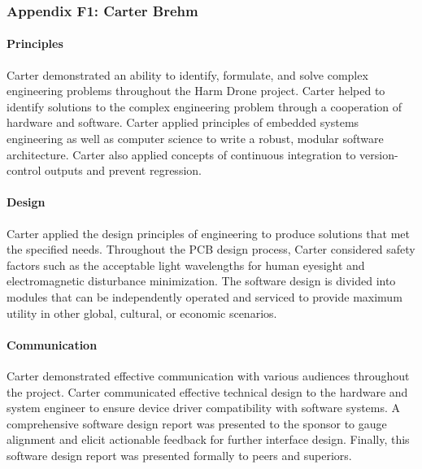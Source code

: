 \documentclass[../../main.tex]{subfiles}
\begin{document}
\subsubsection{Appendix F1: Carter Brehm}

\paragraph{Principles} Carter demonstrated an ability to identify, formulate, and solve complex engineering problems throughout the Harm Drone project. Carter helped to identify solutions to the complex engineering problem through a cooperation of hardware and software. Carter applied principles of embedded systems engineering as well as computer science to write a robust, modular software architecture. Carter also applied concepts of continuous integration to version-control outputs and prevent regression.


\paragraph{Design} Carter applied the design principles of engineering to produce solutions that met the specified needs. Throughout the PCB design process, Carter considered safety factors such as the acceptable light wavelengths for human eyesight and electromagnetic disturbance minimization. The software design is divided into modules that can be independently operated and serviced to provide maximum utility in other global, cultural, or economic scenarios.


\paragraph{Communication} Carter demonstrated effective communication with various audiences throughout the project. Carter communicated effective technical design to the hardware and system engineer to ensure device driver compatibility with software systems. A comprehensive software design report was presented to the sponsor to gauge alignment and elicit actionable feedback for further interface design. Finally, this software design report was presented formally to peers and superiors.
\end{document}
